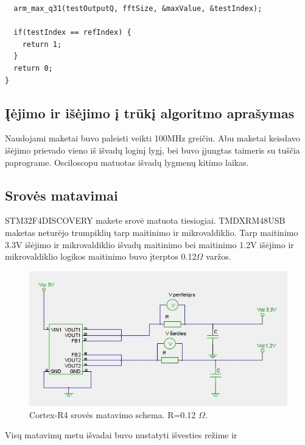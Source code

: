 \documentclass[a4paper, 12pt]{article} %
\begin{document}
\begin{onehalfspacing}
\begin{verbatim}
  arm_max_q31(testOutputQ, fftSize, &maxValue, &testIndex); 

  if(testIndex == refIndex) { 
    return 1;
  } 
  return 0;
}
\end{verbatim}
\subsection{\k{I}\.ejimo ir i\v{s}\.ejimo \k{i} tr\=uk\k{i} algoritmo apra\v{s}ymas}
Naudojami maketai buvo paleisti veikti 100MHz grei\v{c}iu. Abu maketai keisdavo i\v{s}\.ejimo prievado vieno i\v{s} i\v{s}vad\k{u} login\k{i} lyg\k{i}, bei buvo \k{i}jungtas taimeris su tu\v{s}\v{c}ia paprograme. Osciloscopu matuotas i\v{s}vad\k{u} lygmen\k{u} kitimo laikas.
\subsection{Srov\.es matavimai}
STM32F4DISCOVERY makete srov\.e matuota tiesiogiai. TMDXRM48USB maketas netur\.ejo 
trumpikli\k{u} tarp maitinimo ir mikrovaldiklio. Tarp maitinimo 3.3V i\v{s}\.ejimo ir mikrovaldiklio i\v{s}vad\k{u} maitinimo bei maitinimo 1.2V i\v{s}\.ejimo ir mikrovaldiklio logikos maitinimo buvo \k{i}terptos 0.12$\Omega$ var\v{z}os. 
\begin{figure}[H] %
\centering %
\includegraphics[scale=0.8]{pav/srovesc.jpeg} %
\captionsetup{labelformat=numbfirst} %
\captionsetup{labelseparator=tarpas}
\caption{Cortex-R4 srov\.{e}s matavimo schema. R=0.12 $\Omega$.}
\label{vienas}
\end{figure}
Vis\k{u} matavim\k{u} metu 
  i\v{s}vadai buvo nustatyti i\v{s}vesties re\v{z}ime ir 

\end{onehalfspacing}
\end{document}

